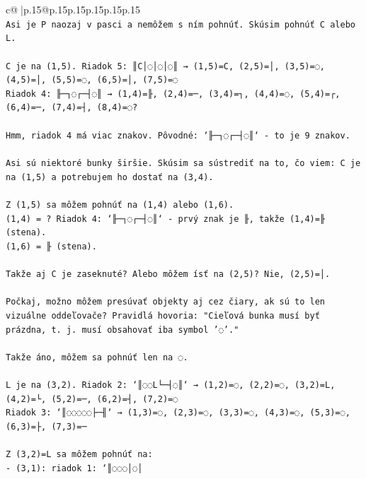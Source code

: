\documentclass{article}
\begin{document}
{\begin{supertabular}{c@{$\;$}|p{.15\linewidth}@{}p{.15\linewidth}p{.15\linewidth}p{.15\linewidth}p{.15\linewidth}p{.15\linewidth}}
{{{\\ 
\texttt{Asi je P naozaj v pasci a nemôžem s ním pohnúť. Skúsim pohnúť C alebo L.} \\
\\ 
\texttt{C je na (1,5). Riadok 5: ║C│◌│◌│◌║ → (1,5)=C, (2,5)=│, (3,5)=◌, (4,5)=│, (5,5)=◌, (6,5)=│, (7,5)=◌} \\
\texttt{Riadok 4: ╟─┐◌┌─┤◌║ → (1,4)=╟, (2,4)=─, (3,4)=┐, (4,4)=◌, (5,4)=┌, (6,4)=─, (7,4)=┤, (8,4)=◌?} \\
\\ 
\texttt{Hmm, riadok 4 má viac znakov. Pôvodné: `╟─┐◌┌─┤◌║` {-} to je 9 znakov.} \\
\\ 
\texttt{Asi sú niektoré bunky širšie. Skúsim sa sústrediť na to, čo viem: C je na (1,5) a potrebujem ho dostať na (3,4). } \\
\\ 
\texttt{Z (1,5) sa môžem pohnúť na (1,4) alebo (1,6). } \\
\texttt{(1,4) = ? Riadok 4: `╟─┐◌┌─┤◌║` {-} prvý znak je ╟, takže (1,4)=╟ (stena).} \\
\texttt{(1,6) = ╟ (stena).} \\
\\ 
\texttt{Takže aj C je zaseknuté? Alebo môžem ísť na (2,5)? Nie, (2,5)=│.} \\
\\ 
\texttt{Počkaj, možno môžem presúvať objekty aj cez čiary, ak sú to len vizuálne oddeľovače? Pravidlá hovoria: "Cieľová bunka musí byť prázdna, t. j. musí obsahovať iba symbol '◌'."} \\
\\ 
\texttt{Takže áno, môžem sa pohnúť len na ◌. } \\
\\ 
\texttt{L je na (3,2). Riadok 2: `║◌◌L└─┤◌║` → (1,2)=◌, (2,2)=◌, (3,2)=L, (4,2)=└, (5,2)=─, (6,2)=┤, (7,2)=◌} \\
\texttt{Riadok 3: `║◌◌◌◌◌├─╢` → (1,3)=◌, (2,3)=◌, (3,3)=◌, (4,3)=◌, (5,3)=◌, (6,3)=├, (7,3)=─} \\
\\ 
\texttt{Z (3,2)=L sa môžem pohnúť na:} \\
\texttt{{-} (3,1): riadok 1: `║◌◌◌│◌│} \\
            }
        }
    }
     \\ \\


\end{supertabular}}
\end{document}
